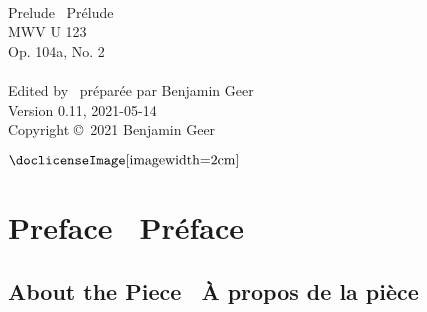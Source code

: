 \documentclass[a4paper, 12pt]{book}
\newcommand{\bigdot}[0]{{\Large \textbullet}}
\begin{document}
\frontmatter


\begin{titlepage}
\begin{center}
   \\
  \vspace{2cm}
  {\fontsize{32}{42}\selectfont Prelude \textbullet\ \foreignlanguage{french}{Prélude}} \\
  \vspace{2 cm}
  {\fontsize{24}{34}\selectfont MWV U 123} \\
  \vspace{0.5 cm}
  {\fontsize{24}{34}\selectfont Op. 104a, No. 2} \\
  \vspace{4.6 cm}
  {\Large {}} \\
  \vspace{0.5 cm}
  {\Large Edited by \textbullet\ \foreignlanguage{french}{préparée par} Benjamin Geer} \\
  \vspace{4.6 cm}
  {\footnotesize Version 0.11, 2021-05-14} \\
  \vspace{0.1 cm}
  {\footnotesize Copyright \copyright\ 2021 Benjamin Geer} \\
  \vspace{0.25 cm}
  \begin{minipage}{\textwidth}
  \centering
  $\vcenter{\hbox{\doclicenseImage[imagewidth=2cm]}}$
  \end{minipage}
  \end{center}
\end{titlepage}


\chapter*{Preface \bigdot\ \foreignlanguage{french}{Préface}}

\section*{About the Piece \bigdot\ \foreignlanguage{french}{À propos de la pièce}}
\end{document}
